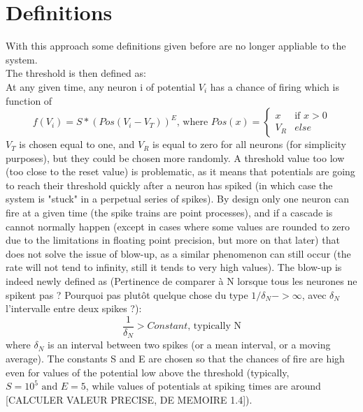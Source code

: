 \section{Definitions}
	With this approach some definitions given before are no longer appliable to the system.\\
	The threshold is then defined as:\\
	At any given time, any neuron i of potential $V_i$ has a chance of firing which is function of
	\begin{equation*}
		f(V_i)=S*(Pos(V_i-V_T))^E\text{, where }Pos(x)=\begin{cases}x & \text{if }x>0\\V_R & else\end{cases}
	\end{equation*}
	$V_T$ is chosen equal to one, and $V_R$ is equal to zero for all neurons (for simplicity purposes), but they could be chosen more randomly. A threshold value too low (too close to the reset value) is problematic, as it means that potentials are going to reach their threshold quickly after a neuron has spiked (in which case the system is "stuck" in a perpetual series of spikes). By design only one neuron can fire at a given time (the spike trains are point processes), and if a cascade is cannot normally happen (except in cases where some values are rounded to zero due to the limitations in floating point precision, but more on that later) that does not solve the issue of blow-up, as a similar phenomenon can still occur (the rate will not tend to infinity, still it tends to very high values). The blow-up is indeed newly defined as (Pertinence de comparer \`a N lorsque tous les neurones ne spikent pas ? Pourquoi pas plut\^ot quelque chose du type $1/\delta_N->\infty$, avec $\delta_N$ l'intervalle entre deux spikes ?):
	\begin{equation*}
		\frac{1}{\delta_N}>Constant\text{, typically N}
	\end{equation*}
	where $\delta_N$ is an interval between two spikes (or a mean interval, or a moving average). The constants S and E are chosen so that the chances of fire are high even for values of the potential low above the threshold (typically, $S=10^5\text{ and }E=5$, while values of potentials at spiking times are around [CALCULER VALEUR PRECISE, DE MEMOIRE 1.4]).

